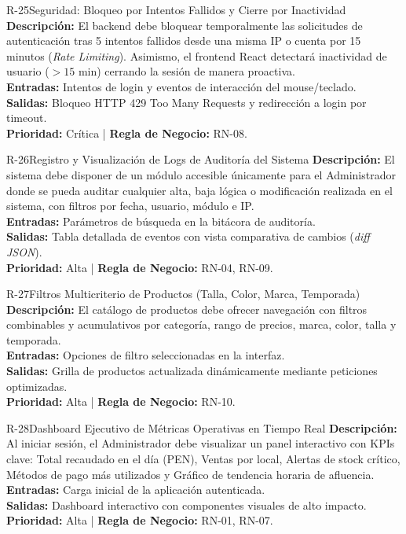 \begin{reqbox}{R-25}{Seguridad: Bloqueo por Intentos Fallidos y Cierre por Inactividad}
\textbf{Descripción:} El backend debe bloquear temporalmente las solicitudes de autenticación tras 5 intentos fallidos desde una misma IP o cuenta por 15 minutos (\textit{Rate Limiting}). Asimismo, el frontend React detectará inactividad de usuario ($>15$ min) cerrando la sesión de manera proactiva.\\
\textbf{Entradas:} Intentos de login y eventos de interacción del mouse/teclado.\\
\textbf{Salidas:} Bloqueo HTTP 429 Too Many Requests y redirección a login por timeout.\\
\textbf{Prioridad:} Crítica | \textbf{Regla de Negocio:} RN-08.
\end{reqbox}

\begin{reqbox}{R-26}{Registro y Visualización de Logs de Auditoría del Sistema}
\textbf{Descripción:} El sistema debe disponer de un módulo accesible únicamente para el Administrador donde se pueda auditar cualquier alta, baja lógica o modificación realizada en el sistema, con filtros por fecha, usuario, módulo e IP.\\
\textbf{Entradas:} Parámetros de búsqueda en la bitácora de auditoría.\\
\textbf{Salidas:} Tabla detallada de eventos con vista comparativa de cambios (\textit{diff JSON}).\\
\textbf{Prioridad:} Alta | \textbf{Regla de Negocio:} RN-04, RN-09.
\end{reqbox}

\begin{reqbox}{R-27}{Filtros Multicriterio de Productos (Talla, Color, Marca, Temporada)}
\textbf{Descripción:} El catálogo de productos debe ofrecer navegación con filtros combinables y acumulativos por categoría, rango de precios, marca, color, talla y temporada.\\
\textbf{Entradas:} Opciones de filtro seleccionadas en la interfaz.\\
\textbf{Salidas:} Grilla de productos actualizada dinámicamente mediante peticiones optimizadas.\\
\textbf{Prioridad:} Alta | \textbf{Regla de Negocio:} RN-10.
\end{reqbox}

\begin{reqbox}{R-28}{Dashboard Ejecutivo de Métricas Operativas en Tiempo Real}
\textbf{Descripción:} Al iniciar sesión, el Administrador debe visualizar un panel interactivo con KPIs clave: Total recaudado en el día (PEN), Ventas por local, Alertas de stock crítico, Métodos de pago más utilizados y Gráfico de tendencia horaria de afluencia.\\
\textbf{Entradas:} Carga inicial de la aplicación autenticada.\\
\textbf{Salidas:} Dashboard interactivo con componentes visuales de alto impacto.\\
\textbf{Prioridad:} Alta | \textbf{Regla de Negocio:} RN-01, RN-07.
\end{reqbox}

